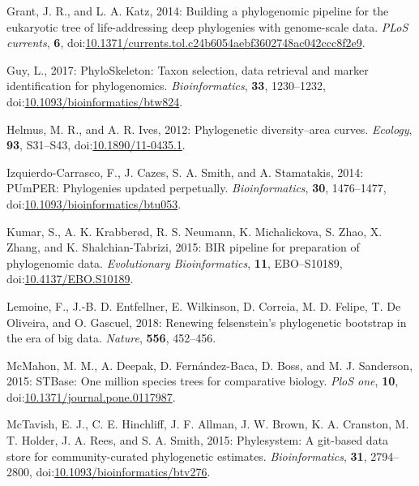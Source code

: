 \documentclass[draft]{ametsoc}
\begin{document}
\leavevmode\hypertarget{ref-grant2014building}{}%
Grant, J. R., and L. A. Katz, 2014: Building a phylogenomic pipeline for
the eukaryotic tree of life-addressing deep phylogenies with
genome-scale data. \emph{PLoS currents}, \textbf{6},
doi:\href{https://doi.org/10.1371/currents.tol.c24b6054aebf3602748ac042ccc8f2e9}{10.1371/currents.tol.c24b6054aebf3602748ac042ccc8f2e9}.

\leavevmode\hypertarget{ref-guy2017phyloskeleton}{}%
Guy, L., 2017: PhyloSkeleton: Taxon selection, data retrieval and marker
identification for phylogenomics. \emph{Bioinformatics}, \textbf{33},
1230--1232,
doi:\href{https://doi.org/10.1093/bioinformatics/btw824}{10.1093/bioinformatics/btw824}.

\leavevmode\hypertarget{ref-helmus2012phylogenetic}{}%
Helmus, M. R., and A. R. Ives, 2012: Phylogenetic diversity--area
curves. \emph{Ecology}, \textbf{93}, S31--S43,
doi:\href{https://doi.org/10.1890/11-0435.1}{10.1890/11-0435.1}.

\leavevmode\hypertarget{ref-izquierdo2014pumper}{}%
Izquierdo-Carrasco, F., J. Cazes, S. A. Smith, and A. Stamatakis, 2014:
PUmPER: Phylogenies updated perpetually. \emph{Bioinformatics},
\textbf{30}, 1476--1477,
doi:\href{https://doi.org/10.1093/bioinformatics/btu053}{10.1093/bioinformatics/btu053}.

\leavevmode\hypertarget{ref-kumar2015bir}{}%
Kumar, S., A. K. Krabberød, R. S. Neumann, K. Michalickova, S. Zhao, X.
Zhang, and K. Shalchian-Tabrizi, 2015: BIR pipeline for preparation of
phylogenomic data. \emph{Evolutionary Bioinformatics}, \textbf{11},
EBO--S10189,
doi:\href{https://doi.org/10.4137/EBO.S10189}{10.4137/EBO.S10189}.

\leavevmode\hypertarget{ref-lemoine2018renewing}{}%
Lemoine, F., J.-B. D. Entfellner, E. Wilkinson, D. Correia, M. D.
Felipe, T. De Oliveira, and O. Gascuel, 2018: Renewing felsenstein's
phylogenetic bootstrap in the era of big data. \emph{Nature},
\textbf{556}, 452--456.

\leavevmode\hypertarget{ref-mcmahon2015stbase}{}%
McMahon, M. M., A. Deepak, D. Fernández-Baca, D. Boss, and M. J.
Sanderson, 2015: STBase: One million species trees for comparative
biology. \emph{PloS one}, \textbf{10},
doi:\href{https://doi.org/10.1371/journal.pone.0117987}{10.1371/journal.pone.0117987}.

\leavevmode\hypertarget{ref-mctavish2015phylesystem}{}%
McTavish, E. J., C. E. Hinchliff, J. F. Allman, J. W. Brown, K. A.
Cranston, M. T. Holder, J. A. Rees, and S. A. Smith, 2015: Phylesystem:
A git-based data store for community-curated phylogenetic estimates.
\emph{Bioinformatics}, \textbf{31}, 2794--2800,
doi:\href{https://doi.org/10.1093/bioinformatics/btv276}{10.1093/bioinformatics/btv276}.
\end{document}

